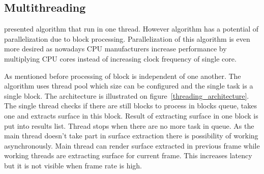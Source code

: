 \subsection{Multithreading}
\cite{RosenbergBirdwell2008} presented algorithm that run in one thread. However algorithm has a potential of parallelization due to block processing. Parallelization of this algorithm is even more desired as nowadays CPU manufacturers increase performance by multiplying CPU cores instead of increasing clock frequency of single core. 

As mentioned before processing of block is independent of one another. The algorithm uses thread pool which size can be configured and the single task is a single block. The architecture is illustrated on figure~\ref{threading_architecture}. The single thread checks if there are still blocks to process in blocks queue, takes one and extracts surface in this block. Result of extracting surface in one block is put into results list. Thread stops when there are no more task in queue. As the main thread doesn't take part in surface extraction there is possibility of working asynchronously. Main thread can render surface extracted in previous frame while working threads are extracting surface for current frame. This increases latency but it is not visible when frame rate is high. 


